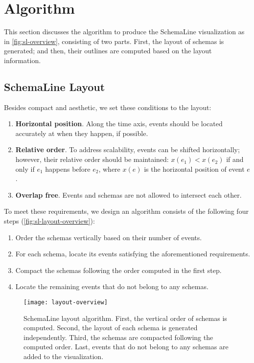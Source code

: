 \section{Algorithm}
\label{sec:sl-algorithm}

This section discusses the algorithm to produce the SchemaLine visualization as in \autoref{fig:sl-overview}, consisting of two parts. First, the layout of schemas is generated; and then, their outlines are computed based on the layout information.

\subsection{SchemaLine Layout}

Besides compact and aesthetic, we set these conditions to the layout: 
\begin{enumerate}
	\item \textbf{Horizontal position}. Along the time axis, events should be located accurately at when they happen, if possible.
	\item \textbf{Relative order}. To address scalability, events can be shifted horizontally; however, their relative order should be maintained: $x(e_1) < x(e_2)$ if and only if $e_1$ happens before $e_2$, where $x(e)$ is the horizontal position of event $e$.
	\item \textbf{Overlap free}. Events and schemas are not allowed to intersect each other.
\end{enumerate}

To meet these requirements, we design an algorithm consists of the following four steps (\autoref{fig:sl-layout-overview}):
\begin{enumerate} 
	\item Order the schemas vertically based on their number of events.
	\item For each schema, locate its events satisfying the aforementioned requirements.
	\item Compact the schemas following the order computed in the first step.
	\item Locate the remaining events that do not belong to any schemas. 
\end{enumerate}

\begin{figure}[!htb]
\centering
\texttt{[image: layout-overview]}
\caption{SchemaLine layout algorithm. First, the vertical order of schemas is computed. Second, the layout of each schema is generated independently. Third, the schemas are compacted following the computed order. Last, events that do not belong to any schemas are added to the visualization.}
\label{fig:sl-layout-overview}
\end{figure}

